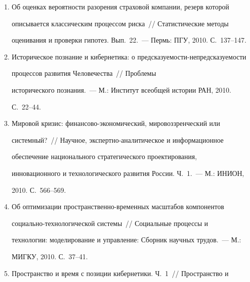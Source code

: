 \begin{enumerate}[1.]
XI Всеросс. науч.~конф. RCDL'2009 <<Электронные библиотеки: 


перспективные методы и технологии, электронные коллекции>> 


(Петрозаводск, 17--21~сентября 2009~г.). Труды Карельского научного 


центра Российской академии наук, 2010. №\,3. С.~98--100.


\item {}


Об оценках вероятности разорения страховой компании, резерв которой 


описывается классическим процессом риска~/\!\!/  Статистические методы 


оценивания и проверки гипотез. Вып.~22.~--- Пермь: ПГУ, 2010. С.~137--147.


\item {}


Историческое познание и кибернетика: о предсказуемости-не\-пред\-ска\-зу\-емости 


процессов развития Человечества~/\!\!/  Проблемы 


исторического познания.~--- М.: Институт всеобщей истории РАН, 2010. 


С.~22--44.


\item {}


Мировой кризис: финансово-экономический, мировоззренческий или 


сис\-темный?~/\!\!/  Научное, экспертно-аналитическое и информационное 


обеспечение национального стратегического проектирования, 


инновационного и технологического развития России. Ч.~1.~--- М.: ИНИОН, 


2010. С.~566--569.


\item {}


Об оптимизации пространственно-временных масштабов компонентов 


социально-технологической сис\-темы~/\!\!/  Социальные процессы и 


технологии: моделирование и управление: Сборник научных трудов.~--- М.: 


МИГКУ, 2010. С.~37--41.


\item {}


Пространство и время с позиции кибернетики. Ч.~1~/\!\!/  Пространство и 



\end{enumerate}
